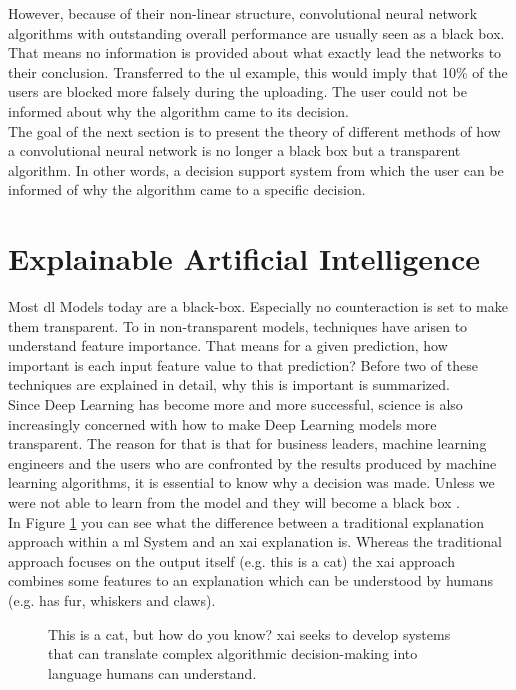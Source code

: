 However, because of their non-linear structure, convolutional neural network algorithms with outstanding overall performance are usually seen as a black box. That means no information is provided about what exactly lead the networks to their conclusion. Transferred to the \gls{ul} example, this would imply that 10\% of the users are blocked more falsely during the uploading.  The user could not be informed about why the algorithm came to its decision.\\

The goal of the next section is to present the theory of different methods of how a convolutional neural network is no longer a black box but a transparent algorithm. In other words, a decision support system from which the user can be informed of why the algorithm came to a specific decision.

\section{Explainable Artificial Intelligence}
Most \gls{dl} Models today are a black-box. Especially no counteraction is set to make them transparent. To in non-transparent models, techniques have arisen to understand feature importance. That means for a given prediction, how important is each input feature value to that prediction? Before two of these techniques are explained in detail, why this is important is summarized.\\

Since Deep Learning has become more and more successful, science is also increasingly concerned with how to make Deep Learning models more transparent. The reason for that is that for business leaders, machine learning engineers and the users who are confronted by the results produced by machine learning algorithms, it is essential to know why a decision was made. Unless we were not able to learn from the model and they will become a black box \cite{MichaelJordan2018} \cite{Kuang2017}.\\

In Figure \ref{fig:xai-old-vs-new} you can see what the difference between a traditional explanation approach within a \Gls{ml} System and an \Gls{xai} explanation is. Whereas the traditional approach focuses on the output itself (e.g. this is a cat) the \Gls{xai} approach combines some features to an explanation which can be understood by humans (e.g. has fur, whiskers and claws).\\

\begin{figure}[htp]
	\centering
	\caption{This is a cat, but how do you know? \Gls{xai} seeks to develop systems that can translate complex algorithmic decision-making into language humans can understand.\cite{Robinson2017}}
	\label{fig:xai-old-vs-new}
\end{figure}

